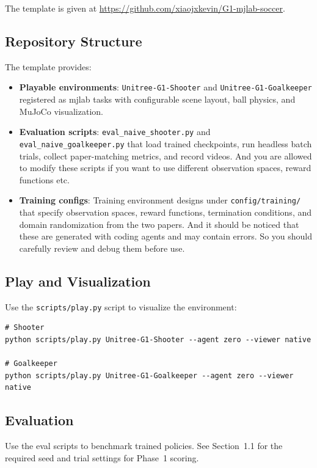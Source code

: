 \documentclass{article}
\begin{document}
The template is given at \href{https://github.com/xiaojxkevin/G1-mjlab-soccer}{https://github.com/xiaojxkevin/G1-mjlab-soccer}.

\subsection{Repository Structure}

The template provides:

\begin{itemize}
  \item \textbf{Playable environments}: \texttt{Unitree-G1-Shooter} and \texttt{Unitree-G1-Goalkeeper} registered as mjlab tasks with configurable scene layout, ball physics, and MuJoCo visualization.
  \item \textbf{Evaluation scripts}: \texttt{eval\_naive\_shooter.py} and \texttt{eval\_naive\_goalkeeper.py} that load trained checkpoints, run headless batch trials, collect paper-matching metrics, and record videos. And you are allowed to modify these scripts if you want to use different observation spaces, reward functions etc.
  \item \textbf{Training configs}: Training environment designs under \texttt{config/training/} that specify observation spaces, reward functions, termination conditions, and domain randomization from the two papers. And it should be noticed that these are generated with coding agents and may contain errors. So you should carefully review and debug them before use.
\end{itemize}

\subsection{Play and Visualization}

Use the \texttt{scripts/play.py} script to visualize the environment:

\begin{verbatim}
# Shooter
python scripts/play.py Unitree-G1-Shooter --agent zero --viewer native

# Goalkeeper
python scripts/play.py Unitree-G1-Goalkeeper --agent zero --viewer native
\end{verbatim}

\subsection{Evaluation}

Use the eval scripts to benchmark trained policies. See Section~1.1 for the
required seed and trial settings for Phase~1 scoring.
\end{document}
